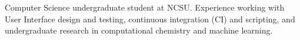 
\begin{cvparagraph}
Computer Science undergraduate student at NCSU. Experience working with User Interface design and testing, continuous integration (CI) and scripting, and undergraduate research in computational chemistry and machine learning.
\end{cvparagraph}